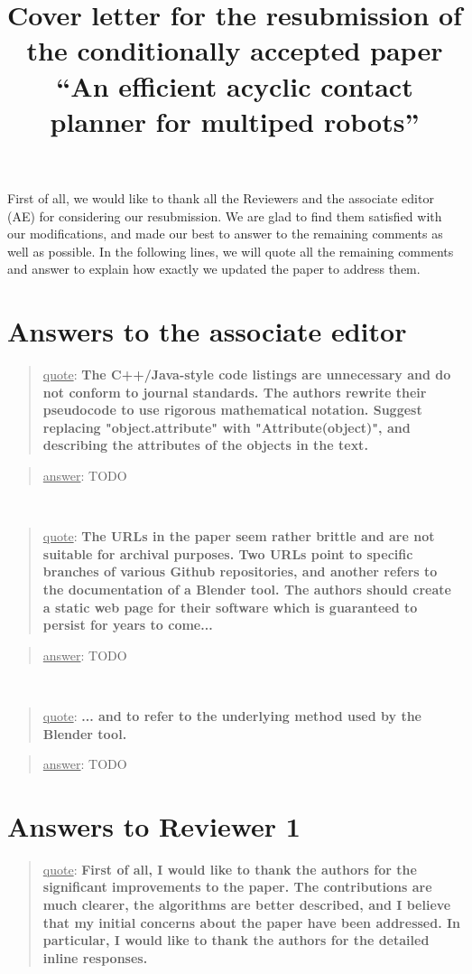 \documentclass[a4paper]{article}
\author {}
\title {Cover letter for the resubmission of the conditionally accepted paper ``An efficient acyclic contact planner for multiped robots''}
\date {}
\newcommand{\ndone}[0]{\textcolor{red}{TODO}}
\newcommand\quot[1]{\begin{quote} \underline{quote}: \textbf{#1}\end{quote}}
\newcommand\as[1]{\begin{quote} \underline{answer}: {#1}\end{quote} }
\begin{document}
\maketitle


First of all, we would like to thank all the Reviewers and the associate editor (AE) for considering our resubmission.
We are glad to find them satisfied with our modifications, and made our best to answer to the remaining comments as well as possible.
In the following lines, we will quote all the remaining comments and answer to explain how exactly we updated the paper to address them.


\section{Answers to the associate editor}

\quot {The C++/Java-style code listings are unnecessary and do not conform
to journal standards.  The authors rewrite their pseudocode to use
rigorous mathematical notation.  Suggest replacing "object.attribute"
with "Attribute(object)", and describing the attributes of the objects
in the text.
}

\as{TODO}
\leavevmode \\

\quot {The URLs in the paper seem rather brittle and are not suitable for
archival purposes.  Two URLs point to specific branches of various
Github repositories, and another refers to the documentation of a
Blender tool.  The authors should create a static web page for their
software which is guaranteed to persist for years to come... }

\as{TODO}

\leavevmode \\

\quot {... and to refer
to the underlying method used by the Blender tool.}

\as{TODO}

\section{Answers to Reviewer 1}

\quot{First of all, I would like to thank the authors for the significant
improvements to the paper. The contributions are much clearer, the
algorithms are better described, and I believe that my initial concerns
about the paper have been addressed. In particular, I would like to
thank the authors for the detailed inline responses.}
\end{document}
